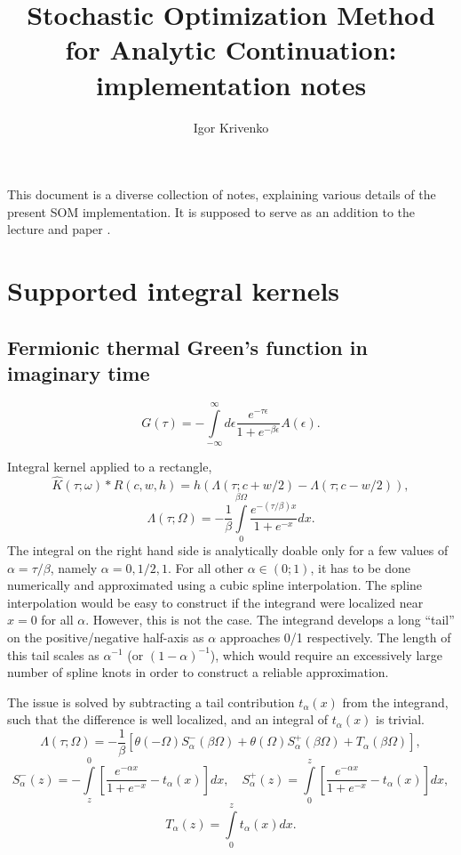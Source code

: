 \documentclass[]{article}
\title{Stochastic Optimization Method for Analytic Continuation: implementation notes}
\author{Igor Krivenko}
\begin{document}
\maketitle

This document is a diverse collection of notes, explaining various details of the present SOM implementation.
It is supposed to serve as an addition to the lecture \cite{som_lecture} and paper \cite{socc_paper}.

\section{Supported integral kernels}
\label{kernels}
\subsection{Fermionic thermal Green's function in imaginary time}
\label{fermiongf_imtime}

\begin{equation}
	G(\tau) = -\int\limits_{-\infty}^\infty
	d\epsilon \frac{e^{-\tau\epsilon}}{1+e^{-\beta\epsilon}} A(\epsilon).
\end{equation}

Integral kernel applied to a rectangle,
\begin{equation}
	\hat K(\tau;\omega)*R(c,w,h) =
	h(\Lambda(\tau;c+w/2) - \Lambda(\tau;c-w/2)),
\end{equation}
\begin{equation}
	\Lambda(\tau;\Omega) = -\frac{1}{\beta}
	\int\limits_0^{\beta\Omega}\frac{e^{-(\tau/\beta)x}}{1+e^{-x}}dx.
\end{equation}
The integral on the right hand side is analytically doable only for
a few values of $\alpha=\tau/\beta$, namely $\alpha=0,1/2,1$.
For all other $\alpha\in(0;1)$, it has to be done numerically and approximated using a cubic spline interpolation. The spline interpolation
would be easy to construct if the integrand were localized near $x=0$ for
all $\alpha$. However, this is not the case. The integrand develops
a long ``tail'' on the positive/negative half-axis as $\alpha$ approaches
0/1 respectively. The length of this tail scales as $\alpha^{-1}$ (or $(1-\alpha)^{-1}$), which would require an excessively large number of
spline knots in order to construct a reliable approximation.

The issue is solved by subtracting a tail contribution $t_\alpha(x)$ from the integrand, such that the difference is well localized, and an integral of $t_\alpha(x)$ is trivial.
\begin{equation}
	\Lambda(\tau;\Omega) = -\frac{1}{\beta} \left[
	\theta(-\Omega)S^-_\alpha(\beta\Omega) +
	\theta(\Omega)S^+_\alpha(\beta\Omega) +
	T_\alpha(\beta\Omega)
	\right],
\end{equation}
\begin{equation}
	S^-_\alpha(z) = -\int\limits_z^0
	\left[\frac{e^{-\alpha x}}{1+e^{-x}} - t_\alpha(x)
	\right] dx,\quad
	S^+_\alpha(z) = \int\limits_0^z
	\left[\frac{e^{-\alpha x}}{1+e^{-x}} - t_\alpha(x)
	\right] dx,
\end{equation}
\begin{equation}
	T_\alpha(z) = \int\limits_0^z t_\alpha(x) dx.
\end{equation}
\end{document}
